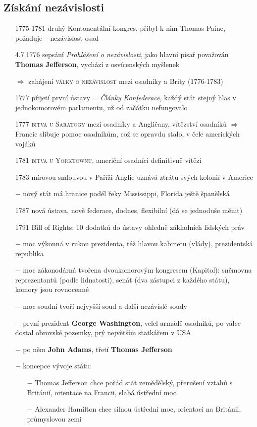 \documentclass{article}
\begin{document}
  \subsection*{Získání nezávislosti}
  \begin{itemize}
      \vspace{-0.5em}
      \setlength\itemsep{0.15em}
    \item[1775-1781] druhý Kontonentální kongres, přibyl k nim Thomas Paine, požaduje  -- nezávislost osad
    \item[4.7.1776] sepsání \textit{Prohlášení o nezávislosti}, jako hlavní písař považován \textbf{Thomas Jefferson}, vychází z osvícenských myšlenek
    \item[$\Rightarrow$] zahájení \textsc{války o nezávislost} mezi osadníky a Brity (1776-1783)
    \item[1777] přijetí první ústavy = \textit{Články Konfederace}, každý stát stejný hlas v jednokomorovém parlamentu, už od začátku nefungovalo
    \item[1777] \textsc{bitva u Saratogy} mezi osadníky a Angličany, vítězství osadníků $\Rightarrow$  Francie slibuje pomoc osadníkům, což se opravdu stalo, v čele amerických vojáků
    \item[1781] \textsc{bitva u Yorktownu}, američní osadníci definitivně vítězí
    \item[1783] mírovou smlouvou v Paříži Anglie uznává ztrátu svých kolonií v Americe
    \item[$-$] nový stát má hranice podél řeky Mississippi, Florida ještě španělská
    \item[1787] nová ústava, nově federace, dodnes, flexibilní (dá se jednoduše měnit)
    \item[1791] Bill of Rights: 10 dodatků do ústavy ohledně základních lidských práv
    \item[$-$] moc výkonná v rukou prezidenta, též hlavou kabinetu (vlády), prezidentská republika
    \item[$-$] moc zákonodárná tvořena dvoukomorovým kongresem (Kapitol): sněmovna reprezentantů (podle lidnatosti), senát (dva zástupci z každého státu), komory jsou rovnocenné
    \item[$-$] moc soudní tvoří nejvyšší soud a další nezávislé soudy
    \item[$-$] první prezident \textbf{George Washington}, velel armádě osadníků, po válce dostal obrovské pozemky, prý největším statkářem v USA
    \item[$-$] po něm \textbf{John Adams}, třetí \textbf{Thomas Jefferson}
    \item[$-$] koncepce vývoje státu:
    \begin{itemize}
        \vspace{-0.5em}
        \setlength\itemsep{0.15em}
        \item[$-$] Thomas Jefferson chce pořád stát zemědělský, přerušení vztahů s Británií, orientace na Francii, slabá ústřední moc
        \item[$-$] Alexander Hamilton chce silnou ústřední moc, orientaci na Británii, průmyslovou zemi
    \end{itemize}

\end{itemize}
\end{document}

